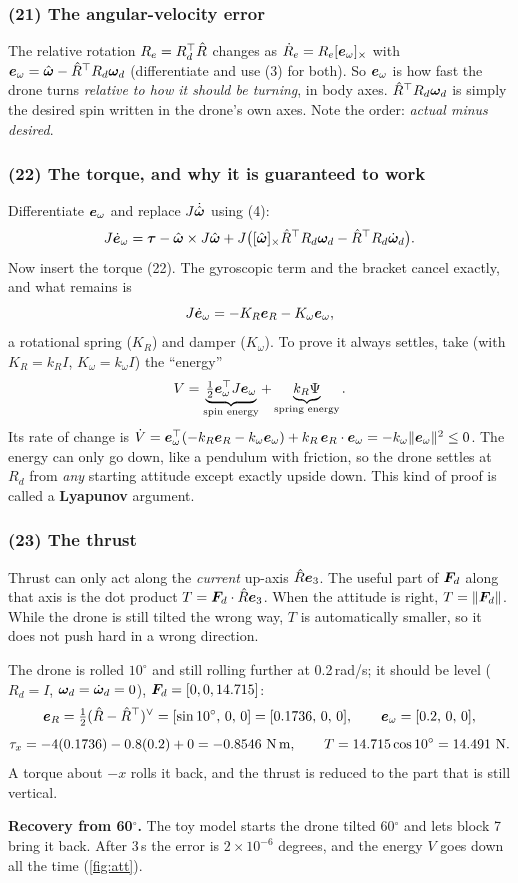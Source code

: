 \subsubsection*{(21) The angular-velocity error}
The relative rotation $R_e=R_d^\top\hat{R}$ changes as $\dot R_e=R_e[\bm{e}_\omega]_{\times}$ with $\bm{e}_\omega=\hat{\bm\omega}-\hat{R}^\top R_d\bm{\omega}_d$
(differentiate and use (3) for both). So $\bm{e}_\omega$ is how fast the drone turns \emph{relative to how it should be
turning}, in body axes. $\hat{R}^\top R_d\bm{\omega}_d$ is simply the desired spin written in the drone's own axes.
Note the order: \emph{actual minus desired}.

\subsubsection*{(22) The torque, and why it is guaranteed to work}
Differentiate $\bm{e}_\omega$ and replace $J\dot{\hat{\bm\omega}}$ using (4):
\[
J\dot{\bm{e}}_\omega=\bm{\tau}-\hat{\bm\omega}\times J\hat{\bm\omega}+J\big([\hat{\bm\omega}]_{\times}\hat{R}^\top R_d\bm{\omega}_d-\hat{R}^\top R_d\dot{\bm{\omega}}_d\big).
\]
Now insert the torque (22). The gyroscopic term and the bracket cancel exactly, and what remains is
\[
J\dot{\bm{e}}_\omega=-K_R\bm{e}_R-K_\omega\bm{e}_\omega ,
\]
a rotational spring ($K_R$) and damper ($K_\omega$). To prove it always settles, take (with $K_R=k_RI$, $K_\omega=k_\omega I$)
the ``energy''
\[
V=\underbrace{\tfrac12\bm{e}_\omega^\top J\bm{e}_\omega}_{\text{spin energy}}+\underbrace{k_R\Psi}_{\text{spring energy}} .
\]
Its rate of change is $\dot V=\bm{e}_\omega^\top(-k_R\bm{e}_R-k_\omega\bm{e}_\omega)+k_R\,\bm{e}_R\cdot\bm{e}_\omega=-k_\omega\|\bm{e}_\omega\|^2\le0$.
The energy can only go down, like a pendulum with friction, so the drone settles at $R_d$ from \emph{any} starting
attitude except exactly upside down. This kind of proof is called a \textbf{Lyapunov} argument.

\subsubsection*{(23) The thrust}
Thrust can only act along the \emph{current} up-axis $\hat{R}\bm{e}_3$. The useful part of $\bm{F}_d$ along that axis is the dot
product $T=\bm{F}_d\cdot\hat{R}\bm{e}_3$. When the attitude is right, $T=\|\bm{F}_d\|$. While the drone is still tilted the wrong way,
$T$ is automatically smaller, so it does not push hard in a wrong direction.

\begin{toy}
The drone is rolled $10^\circ$ and still rolling further at 0.2\,rad/s; it should be level ($R_d=I$, $\bm{\omega}_d=\dot{\bm{\omega}}_d=0$),
$\bm{F}_d=[0,0,14.715]$:
\[
\bm{e}_R=\tfrac12(\hat{R}-\hat{R}^\top)^\vee=[\sin10^\circ,\,0,\,0]=[0.1736,\,0,\,0],\qquad \bm{e}_\omega=[0.2,\,0,\,0],
\]
\[
\tau_x=-4(0.1736)-0.8(0.2)+0=-0.8546\ \text{N\,m},\qquad T=14.715\cos10^\circ=14.491\ \text{N}.
\]
A torque about $-x$ rolls it back, and the thrust is reduced to the part that is still vertical.

\textbf{Recovery from 60$^\circ$.} The toy model starts the drone tilted 60$^\circ$ and lets block 7 bring it back. After 3\,s
the error is $2\times10^{-6}$ degrees, and the energy $V$ goes down all the time (\cref{fig:att}).
\end{toy}

